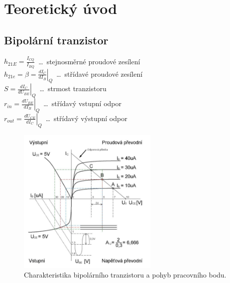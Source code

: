 \documentclass{protokol}
\begin{document}
	\maketitle
	
	\section{Teoretický úvod}
	
	\subsection{Bipolární tranzistor}
		$ h_{21E}=\frac{I_{C Q}}{I_{B Q}} $~\dots~stejnosměrné proudové zesílení\\
		$ h_{21e}=\beta=\left.\frac{d I_C}{d I_B}\right|_Q $~\dots~střídavé proudové zesílení\\
		$ S=\left.\frac{d I_C}{d U_{B E}}\right|_Q $~\dots~strmost tranzistoru\\
		$ r_{i n}=\left.\frac{d U_{B E}}{d I_B}\right|_Q $~\dots~střídavý vstupní odpor\\
		$ r_{out}=\left.\frac{d U_{C E}}{d I_C}\right|_Q $~\dots~střídavý výstupní odpor\\
		\begin{figure}[h!]
			\centering
			\includegraphics[width=0.6\textwidth]{bipolar.png}
			\centering
			\caption{Charakteristika bipolárního tranzistoru a pohyb pracovního bodu.}
			\label{fig:bipolar}
		\end{figure}\\
	
\end{document}
